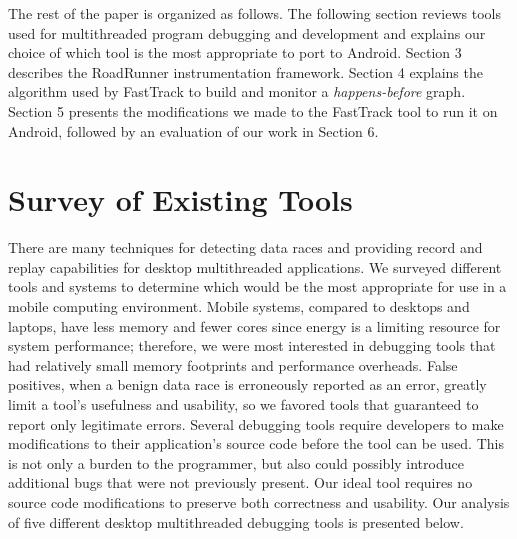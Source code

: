 \documentclass{acm_proc_article-sp}
\begin{document}
The rest of the paper is organized as follows. The following section reviews tools used for multithreaded program debugging and development and explains our choice of which tool is the most appropriate to port to Android. Section 3 describes the  RoadRunner instrumentation framework. Section 4 explains the algorithm used by FastTrack to build and monitor a \emph{happens-before} graph. Section 5 presents the modifications we made to the FastTrack tool to run it on Android, followed by an evaluation of our work in Section 6. 

\section{Survey of Existing Tools}
There are many techniques for detecting data races and providing record and replay capabilities for desktop multithreaded applications. We surveyed different tools and systems to determine which would be the most appropriate for use in a mobile computing environment. Mobile systems, compared to desktops and laptops, have less memory and fewer cores since energy is a limiting resource for system performance; therefore, we were most interested in debugging tools that had relatively small memory footprints and performance overheads. False positives, when a benign data race is erroneously reported as an error, greatly limit a tool's usefulness and usability, so we favored tools that guaranteed to report only legitimate errors. Several debugging tools require developers to make modifications to their application's source code before the tool can be used. This is not only a burden to the programmer, but also could possibly introduce additional bugs that were not previously present. Our ideal tool requires no source code modifications to preserve both correctness and usability. Our analysis of five different desktop multithreaded debugging tools is presented below.
\end{document}
